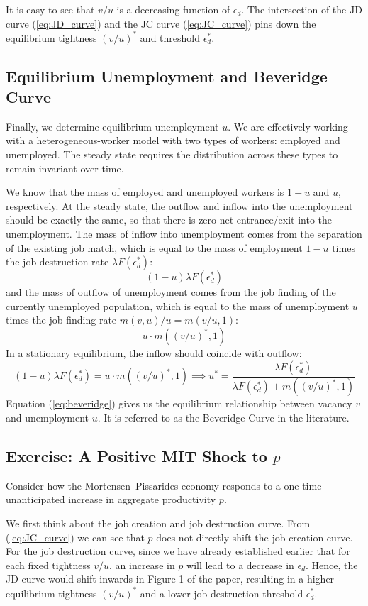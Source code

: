 \documentclass[12pt]{article}
\begin{document}
It is easy to see that $v/u$ is a decreasing function of $\epsilon_d$. The intersection of the JD curve (\ref{eq:JD_curve}) and the JC curve (\ref{eq:JC_curve}) pins down the equilibrium tightness $(v/u)^*$ and threshold $\epsilon_d^*$.

\subsection{Equilibrium Unemployment and Beveridge Curve}

Finally, we determine equilibrium unemployment $u$. We are effectively working with a heterogeneous-worker model with two types of workers: employed and unemployed. The steady state requires the distribution across these types to remain invariant over time. 

We know that the mass of employed and unemployed workers is $1-u$ and $u$, respectively. At the steady state, the outflow and inflow into the unemployment should be exactly the same, so that there is zero net entrance/exit into the unemployment. The mass of inflow into unemployment comes from the separation of the existing job match, which is equal to the mass of employment $1-u$ times the job destruction rate $\lambda F(\epsilon_d^*)$:
\[(1-u) \lambda F(\epsilon_d^*)\]
and the mass of outflow of unemployment comes from the job finding of the currently unemployed population, which is equal to the mass of unemployment $u$ times the job finding rate $m(v,u)/u = m(v/u, 1)$:
\[u \cdot m((v/u)^*, 1)\]
In a stationary equilibrium, the inflow should coincide with outflow:
\begin{equation} \label{eq:beveridge}
	(1-u) \lambda F(\epsilon_d^*) = u \cdot m((v/u)^*, 1) \implies u^* = \frac{\lambda F(\epsilon_d^*)}{\lambda F(\epsilon_d^*) + m ((v/u)^*,1)}
\end{equation}
Equation (\ref{eq:beveridge}) gives us the equilibrium relationship between vacancy $v$ and unemployment $u$. It is referred to as the Beveridge Curve in the literature.

\subsection{Exercise: A Positive MIT Shock to $p$}
Consider how the Mortensen--Pissarides economy responds to a one-time unanticipated increase in aggregate productivity $p$. 

We first think about the job creation and job destruction curve. From (\ref{eq:JC_curve}) we can see that $p$ does not directly shift the job creation curve. For the job destruction curve, since we have already established earlier that for each fixed tightness $v/u$, an increase in $p$ will lead to a decrease in $\epsilon_d$. Hence, the JD curve would shift inwards in Figure 1 of the paper, resulting in a higher equilibrium tightness $(v/u)^*$ and a lower job destruction threshold $\epsilon_d^*$.
\end{document}
